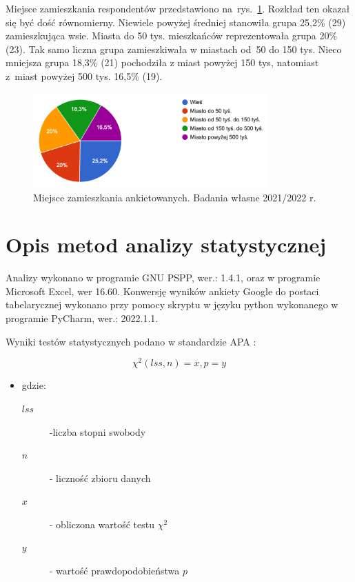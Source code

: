 \documentclass[a4paper,12pt,twoside,openright]{mwrep}
\begin{document}
Miejsce zamieszkania  respondentów przedstawiono na~rys.~\ref{rys:zamiesz}. Rozkład ten okazał się być dość równomierny. Niewiele powyżej średniej stanowiła grupa 25,2\% (29) zamieszkująca  wsie. Miasta do 50 tys. mieszkańców reprezentowała grupa  20\%  (23). Tak samo liczna grupa zamieszkiwała w miastach od~50 do 150 tys. Nieco mniejsza grupa  18,3\% (21) pochodziła z miast powyżej 150 tys, natomiast z~miast powyżej 500 tys. 16,5\% (19).
\begin{figure}[H]
\centering
\includegraphics[width=9cm]{char_gr_bad/zamieszka00}
\caption{Miejsce zamieszkania ankietowanych. Badania własne 2021/2022 r.}
\label{rys:zamiesz}
\end{figure}

\section{Opis metod analizy statystycznej}

Analizy wykonano w programie GNU PSPP, wer.: 1.4.1, oraz w programie Microsoft Excel, wer 16.60. Konwersję wyników ankiety Google do postaci tabelarycznej wykonano przy pomocy skryptu w języku python wykonanego w programie PyCharm, wer.: 2022.1.1.

\vspace{\baselineskip} 

Wyniki testów statystycznych podano w standardzie APA \cite{apa}:\newline

    \[\chi^2 (lss, n) = x, p=y\]

\begin{itemize}
\item[] gdzie:
\begin{description}
\item[$lss$] -liczba stopni swobody
\item[$n$] - liczność zbioru danych
\item[$x$] - obliczona wartość testu $\chi^2$
\item[$y$] - wartość prawdopodobieństwa $p$
\end{description}
\end{itemize}
\end{document}
